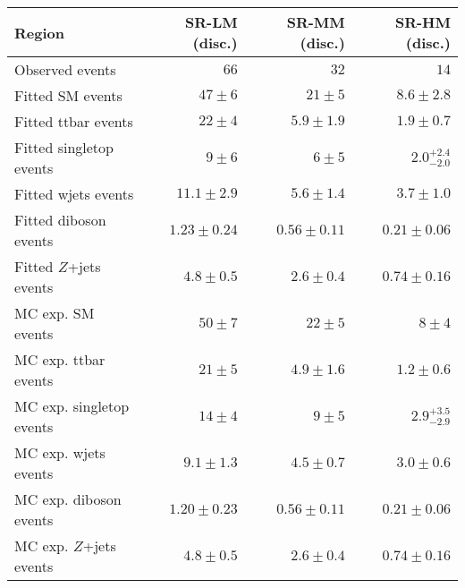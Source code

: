 

\begin{table}
\begin{center}
{\small
\begin{tabular}{lrrr}
\toprule
Region           & SR-LM (disc.)           & SR-MM (disc.)           & SR-HM  (disc.)            \\
\midrule
Observed events          & $66$              & $32$              & $14$                    \\
\midrule
Fitted SM events         & $47 \pm 6$          & $21 \pm 5$          & $8.6 \pm 2.8$              \\
\midrule
        Fitted ttbar events         & $22 \pm 4$          & $5.9 \pm 1.9$          & $1.9 \pm 0.7$              \\
        Fitted singletop events         & $9 \pm 6$          & $6 \pm 5$          & $2.0_{-2.0}^{+2.4}$              \\
        Fitted wjets events         & $11.1 \pm 2.9$          & $5.6 \pm 1.4$          & $3.7 \pm 1.0$              \\
        Fitted diboson events         & $1.23 \pm 0.24$          & $0.56 \pm 0.11$          & $0.21 \pm 0.06$              \\
        Fitted $Z$+jets events         & $4.8 \pm 0.5$          & $2.6 \pm 0.4$          & $0.74 \pm 0.16$              \\
\toprule
MC exp. SM events              & $50 \pm 7$          & $22 \pm 5$          & $8 \pm 4$              \\
\midrule
        MC exp. ttbar events         & $21 \pm 5$          & $4.9 \pm 1.6$          & $1.2 \pm 0.6$              \\
        MC exp. singletop events         & $14 \pm 4$          & $9 \pm 5$          & $2.9_{-2.9}^{+3.5}$              \\
        MC exp. wjets events         & $9.1 \pm 1.3$          & $4.5 \pm 0.7$          & $3.0 \pm 0.6$              \\
        MC exp. diboson events         & $1.20 \pm 0.23$          & $0.56 \pm 0.11$          & $0.21 \pm 0.06$              \\
        MC exp. $Z$+jets events         & $4.8 \pm 0.5$          & $2.6 \pm 0.4$          & $0.74 \pm 0.16$              \\
\bottomrule
\end{tabular}
}
\end{center}
\caption{}
\label{tab:results_bkg_only_SR_disc}
\end{table}
%